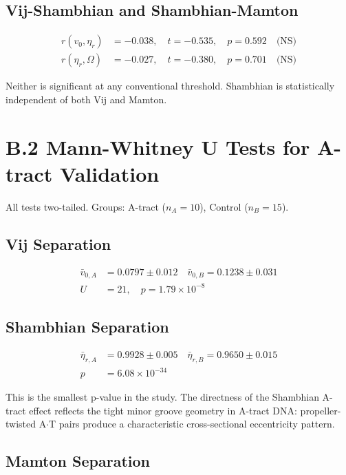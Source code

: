 \subsection{Vij-Shambhian and Shambhian-Mamton}

\begin{align}
    r(v_0, \eta_r) &= -0.038, \quad t = -0.535, \quad p = 0.592 \quad \text{(NS)} \\
    r(\eta_r, \Omega) &= -0.027, \quad t = -0.380, \quad p = 0.701 \quad \text{(NS)}
\end{align}

Neither is significant at any conventional threshold. Shambhian is statistically independent of both Vij and Mamton.

\section{B.2 Mann-Whitney U Tests for A-tract Validation}

All tests two-tailed. Groups: A-tract ($n_A = 10$), Control ($n_B = 15$).

\subsection{Vij Separation}

\begin{align}
    \bar{v}_{0,A} &= 0.0797 \pm 0.012 \quad \bar{v}_{0,B} = 0.1238 \pm 0.031 \\
    U &= 21, \quad p = 1.79 \times 10^{-8}
\end{align}

\subsection{Shambhian Separation}

\begin{align}
    \bar{\eta}_{r,A} &= 0.9928 \pm 0.005 \quad \bar{\eta}_{r,B} = 0.9650 \pm 0.015 \\
    p &= 6.08 \times 10^{-34}
\end{align}

This is the smallest p-value in the study. The directness of the Shambhian A-tract effect reflects the tight minor groove geometry in A-tract DNA: propeller-twisted A$\cdot$T pairs produce a characteristic cross-sectional eccentricity pattern.

\subsection{Mamton Separation}

